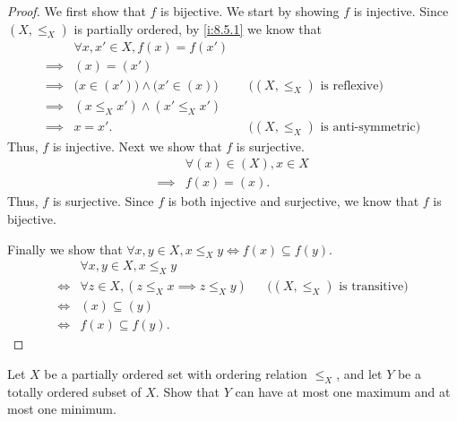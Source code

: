 \begin{proof}
  We first show that \(f\) is bijective.
  We start by showing \(f\) is injective.
  Since \((X, \leq_X)\) is partially ordered, by \cref{i:8.5.1} we know that
  \begin{align*}
             & \forall x, x' \in X, f(x) = f(x')                                                               \\
    \implies & (x) = (x')                                                                                      \\
    \implies & \big(x \in (x')\big) \land \big(x' \in (x)\big) &  & \text{(\((X, \leq_X)\) is reflexive)}      \\
    \implies & (x \leq_X x') \land (x' \leq_X x')                                                              \\
    \implies & x = x'.                                         &  & \text{(\((X, \leq_X)\) is anti-symmetric)}
  \end{align*}
  Thus, \(f\) is injective.
  Next we show that \(f\) is surjective.
  \begin{align*}
             & \forall (x) \in (X), x \in X \\
    \implies & f(x) = (x).
  \end{align*}
  Thus, \(f\) is surjective.
  Since \(f\) is both injective and surjective, we know that \(f\) is bijective.

  Finally we show that \(\forall x, y \in X, x \leq_X y \iff f(x) \subseteq f(y)\).
  \begin{align*}
         & \forall x, y \in X, x \leq_X y                                                                \\
    \iff & \forall z \in X, (z \leq_X x \implies z \leq_X y) &  & \text{(\((X, \leq_X)\) is transitive)} \\
    \iff & (x) \subseteq (y)                                                                             \\
    \iff & f(x) \subseteq f(y).
  \end{align*}
\end{proof}

\begin{ex}\label{i:ex:8.5.7}
  Let \(X\) be a partially ordered set with ordering relation \(\leq_X\), and let \(Y\) be a totally ordered subset of \(X\).
  Show that \(Y\) can have at most one maximum and at most one minimum.
\end{ex}

